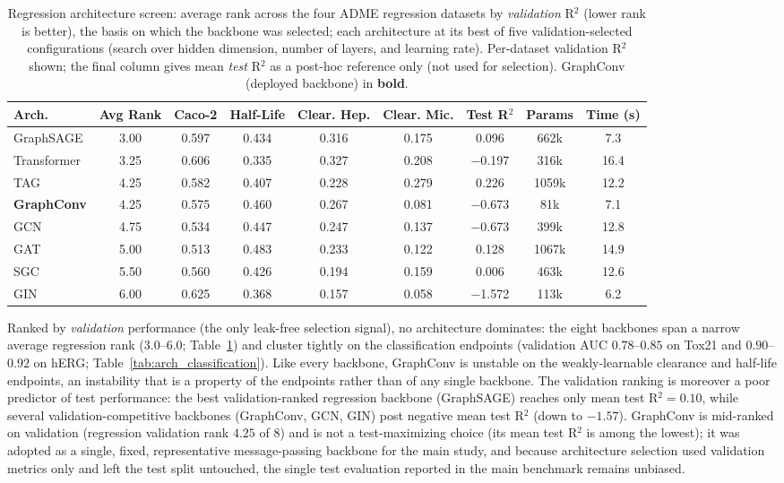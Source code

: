 \documentclass[journal,onecolumn]{IEEEtran}
\begin{document}
\begin{table}[H]
\centering
\caption{Regression architecture screen: average rank across the four ADME regression datasets by \emph{validation} R$^2$ (lower rank is better), the basis on which the backbone was selected; each architecture at its best of five validation-selected configurations (search over hidden dimension, number of layers, and learning rate). Per-dataset validation R$^2$ shown; the final column gives mean \emph{test} R$^2$ as a post-hoc reference only (not used for selection). GraphConv (deployed backbone) in \textbf{bold}.}
\label{tab:arch_regression}
\small
\setlength{\tabcolsep}{4pt}
\begin{tabular}{lcccccccc}
\toprule
\textbf{Arch.} & \textbf{Avg Rank} & \textbf{Caco-2} & \textbf{Half-Life} & \textbf{Clear. Hep.} & \textbf{Clear. Mic.} & \textbf{Test R$^2$} & \textbf{Params} & \textbf{Time (s)} \\
\midrule
GraphSAGE & 3.00 & 0.597 & 0.434 & 0.316 & 0.175 & 0.096 & 662k & 7.3 \\
Transformer & 3.25 & 0.606 & 0.335 & 0.327 & 0.208 & $-$0.197 & 316k & 16.4 \\
TAG & 4.25 & 0.582 & 0.407 & 0.228 & 0.279 & 0.226 & 1059k & 12.2 \\
\textbf{GraphConv} & 4.25 & 0.575 & 0.460 & 0.267 & 0.081 & $-$0.673 & 81k & 7.1 \\
GCN & 4.75 & 0.534 & 0.447 & 0.247 & 0.137 & $-$0.673 & 399k & 12.8 \\
GAT & 5.00 & 0.513 & 0.483 & 0.233 & 0.122 & 0.128 & 1067k & 14.9 \\
SGC & 5.50 & 0.560 & 0.426 & 0.194 & 0.159 & 0.006 & 463k & 12.6 \\
GIN & 6.00 & 0.625 & 0.368 & 0.157 & 0.058 & $-$1.572 & 113k & 6.2 \\
\bottomrule
\end{tabular}
\end{table}

Ranked by \emph{validation} performance (the only leak-free selection signal), no architecture dominates: the eight backbones span a narrow average regression rank ($3.0$--$6.0$; Table~\ref{tab:arch_regression}) and cluster tightly on the classification endpoints (validation AUC $0.78$--$0.85$ on Tox21 and $0.90$--$0.92$ on hERG; Table~\ref{tab:arch_classification}). Like every backbone, GraphConv is unstable on the weakly-learnable clearance and half-life endpoints, an instability that is a property of the endpoints rather than of any single backbone. The validation ranking is moreover a poor predictor of test performance: the best validation-ranked regression backbone (GraphSAGE) reaches only mean test R$^2 = 0.10$, while several validation-competitive backbones (GraphConv, GCN, GIN) post negative mean test R$^2$ (down to $-1.57$). GraphConv is mid-ranked on validation (regression validation rank $4.25$ of $8$) and is not a test-maximizing choice (its mean test R$^2$ is among the lowest); it was adopted as a single, fixed, representative message-passing backbone for the main study, and because architecture selection used validation metrics only and left the test split untouched, the single test evaluation reported in the main benchmark remains unbiased.
\end{document}
